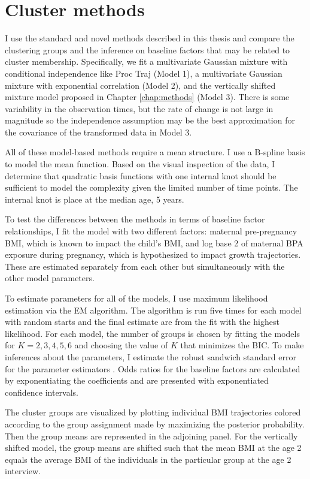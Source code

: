 \section{Cluster methods}
I use the standard and novel methods described in this thesis and compare the clustering groups and the inference on baseline factors that may be related to cluster membership. Specifically, we fit a multivariate Gaussian mixture with conditional independence like Proc Traj (Model 1), a multivariate Gaussian mixture with exponential correlation (Model 2), and the vertically shifted mixture model proposed in Chapter \ref{chap:methods} (Model 3). There is some variability in the observation times, but the rate of change is not large in magnitude so the independence assumption may be the best approximation for the covariance of the transformed data in Model 3.

All of these model-based methods require a mean structure. I use a B-spline basis to model the mean function. Based on the visual inspection of the data, I determine that quadratic basis functions with one internal knot should be sufficient to model the complexity given the limited number of time points.  The internal knot is place at the median age, 5 years. 

To test the differences between the methods in terms of baseline factor relationships, I fit the model with two different factors: maternal pre-pregnancy BMI, which is known to impact the child's BMI, and log base 2 of maternal BPA exposure during pregnancy, which is hypothesized to impact growth trajectories. These are estimated separately from each other but simultaneously with the other model parameters.

To estimate parameters for all of the models, I use maximum likelihood estimation via the EM algorithm. The algorithm is run five times for each model with random starts and the final estimate are from the fit with the highest likelihood. For each model, the number of groups is chosen by fitting the models for $K=2,3,4,5,6$ and choosing the value of $K$ that minimizes the BIC. To make inferences about the parameters, I estimate the robust sandwich standard error for the parameter estimators \cite{white1982}. Odds ratios for the baseline factors are calculated by exponentiating the coefficients and are presented with exponentiated confidence intervals.

The cluster groups are visualized by plotting individual BMI trajectories colored according to the group assignment made by maximizing the posterior probability. Then the group means are represented in the adjoining panel. For the vertically shifted model, the group means are shifted such that the mean BMI at the age 2 equals the average BMI of the individuals in the particular group at the age 2 interview. 

